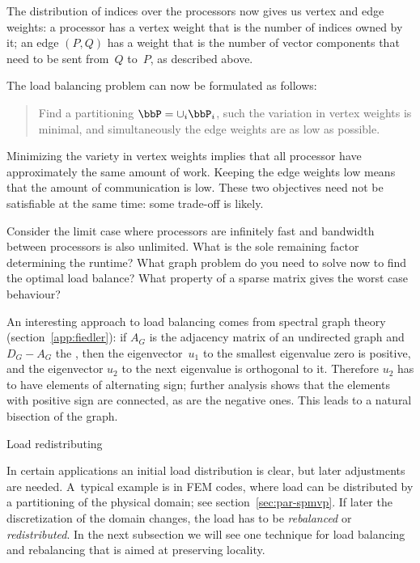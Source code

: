 The distribution of indices over the processors now gives us vertex
and edge weights: a processor has a vertex weight that is the number
of indices owned by it; an edge $(P,Q)$ has a weight that is the number of
vector components that need to be sent from~$Q$ to~$P$, as described above.

The load balancing problem can now be formulated as
follows:
\begin{quote}
  Find a partitioning $\bbP=\cup_i \bbP_i$, such the variation in
  vertex weights is minimal, and simultaneously the edge weights are
  as low as possible.
\end{quote}
Minimizing the variety in vertex weights implies that all processor
have approximately the same amount of work. Keeping the edge weights
low means that the amount of communication is low. These two
objectives need not be satisfiable at the same time: some trade-off is
likely. 

\begin{exercise}
  Consider the limit case where processors are infinitely fast and
  bandwidth between processors is also unlimited. What is the sole
  remaining factor determining the runtime? What graph problem do you
  need to solve now to find the optimal load balance? What property of
  a sparse matrix gives the worst case behaviour?
\end{exercise}

An interesting approach to load balancing comes from spectral graph
theory (section~\ref{app:fiedler}): if $A_G$ is the adjacency matrix
of an undirected graph and $D_G-A_G$ the ,
then the eigenvector~$u_1$ to the smallest eigenvalue zero is
positive, and the eigenvector $u_2$ to the next eigenvalue is
orthogonal to it. Therefore $u_2$ has to have elements of alternating
sign; further analysis shows that the elements with positive sign are
connected, as are the negative ones. This leads to a natural bisection
of the graph.

 {Load redistributing}

In certain applications an initial load distribution is clear, but
later adjustments are needed. A~typical example is in \ac{FEM} codes,
where load can be distributed by a partitioning of the physical
domain; see section~\ref{sec:par-spmvp}. If later the discretization
of the domain changes, the load has to be
\emph{rebalanced} or
\emph{redistributed}. In the next
subsection we will see one technique for load balancing and
rebalancing that is aimed at preserving locality.

